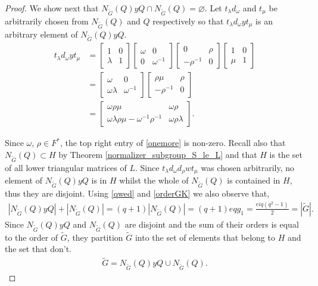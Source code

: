\begin{proof}
We show next that $N_{\widetilde{G}}(Q) y Q \cap N_{\widetilde{G}}(Q) = \varnothing$. Let $t_\lambda d_\omega$ and $t_\mu$ be arbitrarily chosen from $N_{\widetilde{G}}(Q)$ and $Q$ respectively so that $t_\lambda d_\omega y t_\mu$ is an arbitrary element of $N_{\widetilde{G}}(Q) y Q$.
\begin{align}\label{onemore} t_\lambda d_\omega y t_\mu &= \begin{bmatrix} 1 & 0 \\ \lambda & 1 \end{bmatrix} \begin{bmatrix} \omega & 0 \\ 0 & \omega^{-1} \end{bmatrix} \begin{bmatrix} 0 & \rho \\ -\rho^{-1} & 0 \end{bmatrix}  \begin{bmatrix} 1 & 0 \\ \mu & 1 \end{bmatrix} \nonumber
\\[1.5ex] &= \begin{bmatrix} \omega & 0 \\ \omega \lambda & \omega^{-1} \end{bmatrix} \begin{bmatrix} \rho \mu & \rho \\ -\rho^{-1} & 0 \end{bmatrix} \nonumber
\\[1.5ex] &= \begin{bmatrix} \omega \rho \mu & \omega \rho  \\ \omega \lambda \rho \mu - \omega^{-1} \rho^{-1} & \omega \rho \lambda \end{bmatrix}.
\end{align}

Since $\omega$, $\rho \in F^*$, the top right entry of \eqref{onemore} is non-zero. Recall also that $N_{\widetilde{G}}(Q) \subset H$ by Theorem \ref{normalizer_subgroup_S_le_L} and that $H$ is the set of all lower triangular matrices of $L$. Since $t_\lambda d_\omega d_\rho w t_\mu$ was chosen arbitrarily, no element of $N_{\widetilde{G}}(Q) y Q$ is in $H$ whilst the whole of $N_{\widetilde{G}}(Q)$ is contained in $H$, thus they are disjoint. Using \eqref{qwed} and \eqref{orderGK} we also observe that,
\begin{align*} |N_{\widetilde{G}}(Q) y Q| + |N_{\widetilde{G}}(Q)| = (q+1)|N_{\widetilde{G}}(Q)| = (q+1)eqg_1 = \frac{eiq(q^2-1)}{2} = |{\widetilde{G}}|.
\end{align*}
Since $N_{\widetilde{G}}(Q) y Q$ and $N_{\widetilde{G}}(Q)$ are disjoint and the sum of their orders is equal to the order of ${\widetilde{G}}$, they partition ${\widetilde{G}}$ into the set of elements that belong to $H$ and the set that don't.
\begin{align}\label{gsplit} {\widetilde{G}} = N_{\widetilde{G}}(Q) y Q \cup N_{\widetilde{G}}(Q).
\end{align}


\end{proof}
